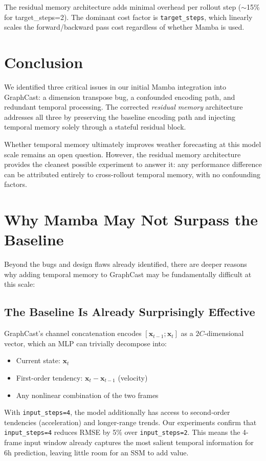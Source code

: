 \documentclass[11pt,a4paper]{article}
\begin{document}
The residual memory architecture adds minimal overhead per rollout step ($\sim$15\% for target\_steps=2). The dominant cost factor is \texttt{target\_steps}, which linearly scales the forward/backward pass cost regardless of whether Mamba is used.

\section{Conclusion}

We identified three critical issues in our initial Mamba integration into GraphCast: a dimension transpose bug, a confounded encoding path, and redundant temporal processing. The corrected \emph{residual memory} architecture addresses all three by preserving the baseline encoding path and injecting temporal memory solely through a stateful residual block.

Whether temporal memory ultimately improves weather forecasting at this model scale remains an open question. However, the residual memory architecture provides the cleanest possible experiment to answer it: any performance difference can be attributed entirely to cross-rollout temporal memory, with no confounding factors.

\section{Why Mamba May Not Surpass the Baseline}

Beyond the bugs and design flaws already identified, there are deeper reasons why adding temporal memory to GraphCast may be fundamentally difficult at this scale:

\subsection{The Baseline Is Already Surprisingly Effective}

GraphCast's channel concatenation encodes $[\mathbf{x}_{t-1}; \mathbf{x}_t]$ as a $2C$-dimensional vector, which an MLP can trivially decompose into:
\begin{itemize}[nosep]
    \item Current state: $\mathbf{x}_t$
    \item First-order tendency: $\mathbf{x}_t - \mathbf{x}_{t-1}$ (velocity)
    \item Any nonlinear combination of the two frames
\end{itemize}
With \texttt{input\_steps=4}, the model additionally has access to second-order tendencies (acceleration) and longer-range trends. Our experiments confirm that \texttt{input\_steps=4} reduces RMSE by 5\% over \texttt{input\_steps=2}. This means the 4-frame input window already captures the most salient temporal information for 6h prediction, leaving little room for an SSM to add value.
\end{document}
